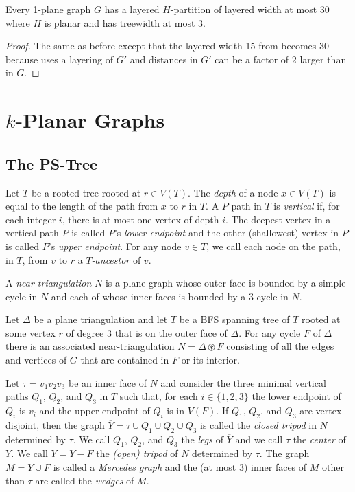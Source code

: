 \documentclass{patmorin}
\begin{document}
\begin{thm}
  Every 1-plane graph $G$ has a layered $H$-partition of layered width at most 30 where $H$ is planar and has treewidth at most 3.
\end{thm}

\begin{proof}
  The same as before except that the layered width 15 from  becomes 30 because  uses a layering of $G'$ and distances in $G'$ can be a factor of 2 larger than in $G$.
\end{proof}

\section{$k$-Planar Graphs}

\subsection{The PS-Tree}

Let $T$ be a rooted tree rooted at $r\in V(T)$. The \emph{depth} of a node $x\in V(T)$ is equal to the length of the path from $x$ to $r$ in $T$. A $P$ path in $T$ is \emph{vertical} if, for each integer $i$, there is at most one vertex of depth $i$.  The deepest vertex in a vertical path $P$ is called  $P$'s \emph{lower endpoint} and the other (shallowest) vertex in $P$ is called $P$'s \emph{upper endpoint}. For any node $v\in T$, we call each node on the path, in $T$, from $v$ to $r$ a \emph{$T$-ancestor} of $v$.

A \emph{near-triangulation} $N$ is a plane graph whose outer face is bounded by a simple cycle in $N$ and each of whose inner faces is bounded by a 3-cycle in $N$.  

Let $\Delta$ be a plane triangulation and let $T$ be a BFS spanning tree of $T$ rooted at some vertex $r$ of degree 3 that is on the outer face of $\Delta$.  For any cycle $F$ of $\Delta$ there is an associated near-triangulation $N=\Delta\circledast F$ consisting of all the edges and vertices of $G$ that are contained in $F$ or its interior.

Let $\tau=v_1v_2v_3$ be an inner face of $N$ and consider the three minimal vertical paths $Q_1$, $Q_2$, and $Q_3$ in $T$ such that, for each $i\in\{1,2,3\}$ the lower endpoint of $Q_i$ is $v_i$ and the upper endpoint of $Q_i$ is in $V(F)$.  If $Q_1$, $Q_2$, and $Q_3$ are vertex disjoint, then the graph $\overline{Y}=\tau\cup Q_1\cup Q_2\cup Q_3$ is called the \emph{closed tripod} in $N$ determined by $\tau$.  We call $Q_1$, $Q_2$, and $Q_3$ the \emph{legs} of $\overline{Y}$ and we call $\tau$ the \emph{center} of $\overline{Y}$.  We call $Y=\overline{Y}-F$ the \emph{(open) tripod} of $N$ determined by $\tau$.  The graph $M=\overline{Y}\cup F$ is called a \emph{Mercedes graph} and the (at most 3) inner faces of $M$ other than $\tau$ are called the \emph{wedges} of $M$.
\end{document}
